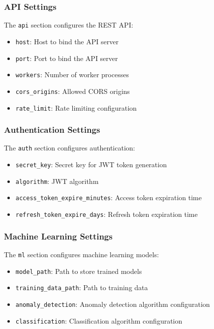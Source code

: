\subsubsection{API Settings}
The \texttt{api} section configures the REST API:

\begin{itemize}
    \item \texttt{host}: Host to bind the API server
    \item \texttt{port}: Port to bind the API server
    \item \texttt{workers}: Number of worker processes
    \item \texttt{cors\_origins}: Allowed CORS origins
    \item \texttt{rate\_limit}: Rate limiting configuration
\end{itemize}

\subsubsection{Authentication Settings}
The \texttt{auth} section configures authentication:

\begin{itemize}
    \item \texttt{secret\_key}: Secret key for JWT token generation
    \item \texttt{algorithm}: JWT algorithm
    \item \texttt{access\_token\_expire\_minutes}: Access token expiration time
    \item \texttt{refresh\_token\_expire\_days}: Refresh token expiration time
\end{itemize}

\subsubsection{Machine Learning Settings}
The \texttt{ml} section configures machine learning models:

\begin{itemize}
    \item \texttt{model\_path}: Path to store trained models
    \item \texttt{training\_data\_path}: Path to training data
    \item \texttt{anomaly\_detection}: Anomaly detection algorithm configuration
    \item \texttt{classification}: Classification algorithm configuration
\end{itemize}

